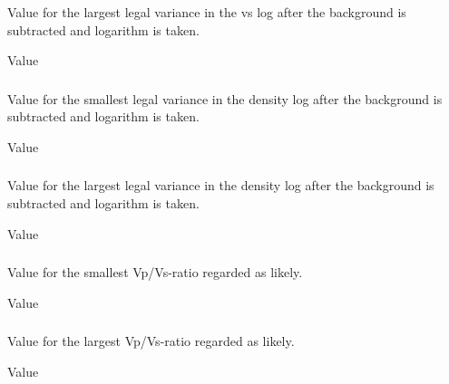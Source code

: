 \subsubsection{}
 \slist
   \item \Description Value for the largest legal variance in the vs log after the background is subtracted and logarithm is taken.
   \item \Argument Value
   \item {}
 \elist

\subsubsection{}
 \slist
   \item \Description Value for the smallest legal variance in the density log after the background is subtracted and logarithm is taken.
   \item \Argument Value
   \item {}
 \elist

\subsubsection{}
 \slist
   \item \Description Value for the largest legal variance in the density log after the background is subtracted and logarithm is taken.
   \item \Argument Value
   \item {}
 \elist

\subsubsection{}
 \slist
   \item \Description Value for the smallest Vp/Vs-ratio regarded as likely.
   \item \Argument Value
   \item {}
 \elist

\subsubsection{}
 \slist
   \item \Description Value for the largest Vp/Vs-ratio regarded as likely.
   \item \Argument Value
   \item {}
 \elist

